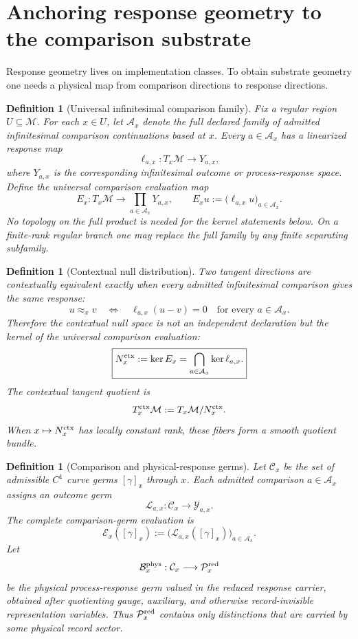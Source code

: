 \documentclass[11pt]{article}
\newtheorem{definition}[theorem]{Definition}
\theoremstyle{remark}
\newcommand{\Mgeom}{\mathcal M}
\begin{document}
\section{Anchoring response geometry to the comparison substrate}
\label{sec:response-anchor}

Response geometry lives on implementation classes.  To obtain substrate geometry one needs a physical map from comparison directions to response directions.

\begin{definition}[Universal infinitesimal comparison family]
Fix a regular region $U\subseteq\Mgeom$.  For each $x\in U$, let
$\mathcal A_x$ denote the full declared family of admitted infinitesimal comparison
continuations based at $x$.  Every $a\in\mathcal A_x$ has a linearized response map
\[
        \ell_{a,x}:T_x\Mgeom\longrightarrow Y_{a,x},
\]
where $Y_{a,x}$ is the corresponding infinitesimal outcome or process-response
space.  Define the universal comparison evaluation map
\[
        E_x:T_x\Mgeom\longrightarrow
        \prod_{a\in\mathcal A_x}Y_{a,x},
        \qquad
        E_xu:=\bigl(\ell_{a,x}u\bigr)_{a\in\mathcal A_x}.
\]
No topology on the full product is needed for the kernel statements below.
On a finite-rank regular branch one may replace the full family by any finite
separating subfamily.
\end{definition}

\begin{definition}[Contextual null distribution]
Two tangent directions are contextually equivalent exactly when every admitted
infinitesimal comparison gives the same response:
\[
        u\approx_x v
        \quad\Longleftrightarrow\quad
        \ell_{a,x}(u-v)=0
        \quad\text{for every }a\in\mathcal A_x.
\]
Therefore the contextual null space is not an independent declaration but the
kernel of the universal comparison evaluation:
\[
        \boxed{
        N_x^{\rm ctx}:=\ker E_x
        =\bigcap_{a\in\mathcal A_x}\ker\ell_{a,x}.}
\]
The contextual tangent quotient is
\[
        T_x^{\rm ctx}\Mgeom:=T_x\Mgeom/N_x^{\rm ctx}.
\]
When $x\mapsto N_x^{\rm ctx}$ has locally constant rank, these fibers form a
smooth quotient bundle.
\end{definition}


\begin{definition}[Comparison and physical-response germs]
\label{def:comparison-response-germs}
Let $\mathcal C_x$ be the set of admissible $C^1$ curve germs
$[\gamma]_x$ through $x$.  Each admitted comparison $a\in\mathcal A_x$ assigns
an outcome germ
\[
        \mathcal L_{a,x}:\mathcal C_x\longrightarrow\mathcal Y_{a,x}.
\]
The complete comparison-germ evaluation is
\[
        \mathcal E_x([\gamma]_x)
        :=\bigl(\mathcal L_{a,x}([\gamma]_x)\bigr)_{a\in\mathcal A_x}.
\]
Let
\[
        \mathcal B_x^{\rm phys}:\mathcal C_x\longrightarrow\mathcal P_x^{\rm red}
\]
be the physical process-response germ valued in the \emph{reduced} response
carrier, obtained after quotienting gauge, auxiliary, and otherwise
record-invisible representation variables.  Thus $\mathcal P_x^{\rm red}$
contains only distinctions that are carried by some physical record sector.
\end{definition}
\end{document}

